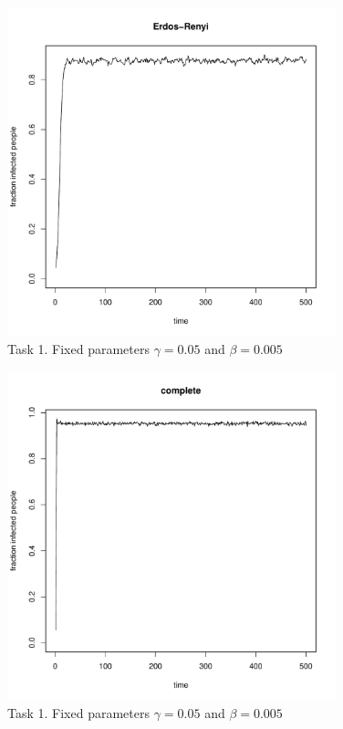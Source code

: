 \documentclass[paper=a4, fontsize=11pt]{scrartcl} %
\begin{document}
\begin{figure}[!h] %
   \centering
   \includegraphics[width=0.85\textwidth]{task1_Erdos-Renyi} 
\caption{Task 1. Fixed parameters $\gamma=0.05$ and $\beta=0.005$}
   \label{task1_erdosrenyi}
\end{figure}
\begin{figure}[!h] %
   \centering
   \includegraphics[width=0.85\textwidth]{task1_complete} 
\caption{Task 1. Fixed parameters $\gamma=0.05$ and $\beta=0.005$}
   \label{task1_complete}
\end{figure}
\end{document}
